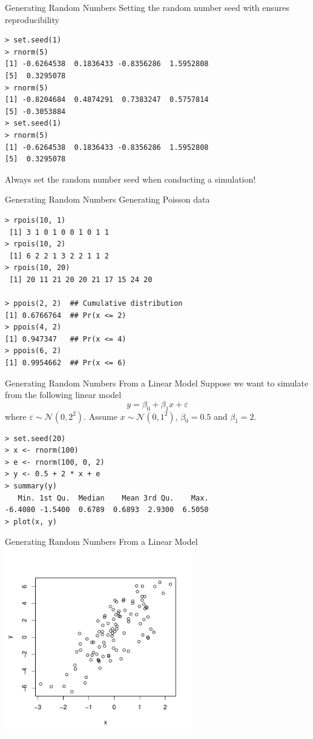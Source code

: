 \documentclass[aspectratio=169]{beamer}
\begin{document}
\begin{frame}[fragile]{Generating Random Numbers}
Setting the random number seed with  ensures
reproducibility
\begin{verbatim}
> set.seed(1)
> rnorm(5)
[1] -0.6264538  0.1836433 -0.8356286  1.5952808
[5]  0.3295078
> rnorm(5)
[1] -0.8204684  0.4874291  0.7383247  0.5757814
[5] -0.3053884
> set.seed(1)
> rnorm(5)
[1] -0.6264538  0.1836433 -0.8356286  1.5952808
[5]  0.3295078
\end{verbatim}
Always set the random number seed when conducting a simulation!
\end{frame}

\begin{frame}[fragile]{Generating Random Numbers}
Generating Poisson data
\begin{verbatim}
> rpois(10, 1)
 [1] 3 1 0 1 0 0 1 0 1 1
> rpois(10, 2)
 [1] 6 2 2 1 3 2 2 1 1 2
> rpois(10, 20)
 [1] 20 11 21 20 20 21 17 15 24 20

> ppois(2, 2)  ## Cumulative distribution
[1] 0.6766764  ## Pr(x <= 2)
> ppois(4, 2)
[1] 0.947347   ## Pr(x <= 4)
> ppois(6, 2)
[1] 0.9954662  ## Pr(x <= 6)
\end{verbatim}
\end{frame}

\begin{frame}[fragile]{Generating Random Numbers From a Linear Model}
Suppose we want to simulate from the following linear model
\[
y = \beta_0 + \beta_1 x + \varepsilon
\]
where $\varepsilon\sim\mathcal{N}(0, 2^2)$. Assume
$x\sim\mathcal{N}(0,1^2)$, $\beta_0 = 0.5$ and $\beta_1 = 2$.
\begin{verbatim}
> set.seed(20)
> x <- rnorm(100)
> e <- rnorm(100, 0, 2)
> y <- 0.5 + 2 * x + e
> summary(y)
   Min. 1st Qu.  Median    Mean 3rd Qu.    Max. 
-6.4080 -1.5400  0.6789  0.6893  2.9300  6.5050 
> plot(x, y)
\end{verbatim}
\end{frame}

\begin{frame}[fragile]{Generating Random Numbers From a Linear Model}
\includegraphics[height=3.2in]{linearmodelsim}
\end{frame}
\end{document}
